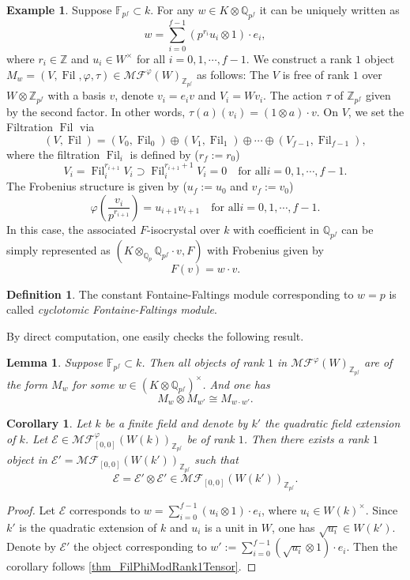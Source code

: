 \documentclass[12pt,twoside]{book}
\theoremstyle{plain}
\newtheorem{lemma}[lemma]{Lemma}
\newtheorem{corollary}[corollary]{Corollary}
\theoremstyle{definition}
\newtheorem{definition}[definition]{Definition}
\newtheorem{example}[example]{Example}
\theoremstyle{remark}
\newcommand{\bF}{{\mathbb F}}
\newcommand{\bQ}{{\mathbb Q}}
\newcommand{\bZ}{{\mathbb Z}}
\newcommand{\mE}{{\mathcal E}}
\DeclareMathOperator\Fil{Fil}
\newcommand{\MF}{\mathcal{MF}}
\numberwithin{equation}{section}
\begin{document}
\begin{example} Suppose $\bF_{p^f}\subset k$. For any $w\in K\otimes\bQ_{p^f}$ it can be uniquely written as
\[w = \sum_{i=0}^{f-1} (p^{r_i}u_i\otimes 1)\cdot e_i,\]
where $r_i\in \bZ$ and $u_i \in W^\times$ for all $i=0,1,\cdots,f-1$. We construct a rank $1$ object $M_{w}=(V,\Fil,\varphi,\tau) \in \MF^\varphi(W)_{\bZ_{p^f}}$ as follows: The $V$ is free of rank $1$ over $W\otimes \bZ_{p^f}$ with a basis $v$, denote $v_i=e_iv$ and $V_i=Wv_i$. The action $\tau$ of $\bZ_{p^f}$ given by the second factor. In other words, $\tau(a)(v_i) = (1\otimes a)\cdot v$. On $V$, we set the Filtration $\Fil$ via
\[(V,\Fil) = (V_0,\Fil_0) \oplus (V_1,\Fil_1) \oplus \cdots \oplus (V_{f-1},\Fil_{f-1}),\]
where the filtration $\Fil_i$ is defined by ($r_f:=r_0$)
\[V_i = \Fil_i^{r_{i+1}}V_i\supset \Fil_i^{r_{i+1}+1}V_i=0 \quad
\text{for all} i=0,1,\cdots,f-1.\]
The Frobenius structure is given by ($u_f:=u_0$ and $v_f:=v_0$)
\[\varphi (\frac{v_i}{p^{r_{i+1}}}) = u_{i+1}v_{i+1} \quad
\text{for all} i=0,1,\cdots,f-1.\]
In this case, the associated $F$-isocrystal over $k$ with coefficient in $\bQ_{p^f}$ can be simply represented as $(K\otimes_{\bQ_p}\bQ_{p^f}\cdot v,F)$ with Frobenius given by
\[F(v) = w\cdot v.\]
\end{example}

\begin{definition} The constant Fontaine-Faltings module corresponding to $w=p$ is called \emph{cyclotomic Fontaine-Faltings module}.
\end{definition}

By direct computation, one easily checks the following result.
\begin{lemma} \label{thm_FilPhiModRank1Tensor}
Suppose $\bF_{p^f}\subset k$. Then all objects of rank $1$ in $\MF^\varphi(W)_{\bZ_{p^f}}$ are of the form $M_w$ for some $w\in (K\otimes \bQ_{p^f})^\times$. And one has
\[M_{w} \otimes M_{w'} \cong M_{w\cdot w'}.\]
\end{lemma}


\begin{corollary} \label{thm_sqroot_constant_FFM_level0}
Let $k$ be a finite field and denote by $k'$ the quadratic field extension of $k$. Let $\mE\in \MF^{\varphi}_{[0,0]}(W(k))_{\bZ_{p^f}}$ be of rank $1$. Then there exists a rank $1$ object in $\mE'=\MF_{[0,0]}(W(k'))_{\bZ_{p^f}}$ such that
\[\mE = \mE'\otimes \mE' \in \MF_{[0,0]}(W(k'))_{\bZ_{p^f}}.\]
\end{corollary}
\begin{proof}
Let $\mE$ corresponds to $w=\sum_{i=0}^{f-1} (u_i\otimes1)\cdot e_i$, where $u_i\in W(k)^\times$. Since $k'$ is the quadratic extension of $k$ and $u_i$ is a unit in $W$, one has $\sqrt{u_i}\in W(k')$. Denote by $\mE'$ the object corresponding to $w':=\sum_{i=0}^{f-1} (\sqrt{u_i}\otimes 1)\cdot e_i$. Then the corollary follows \autoref{thm_FilPhiModRank1Tensor}.
\end{proof}
\end{document}
